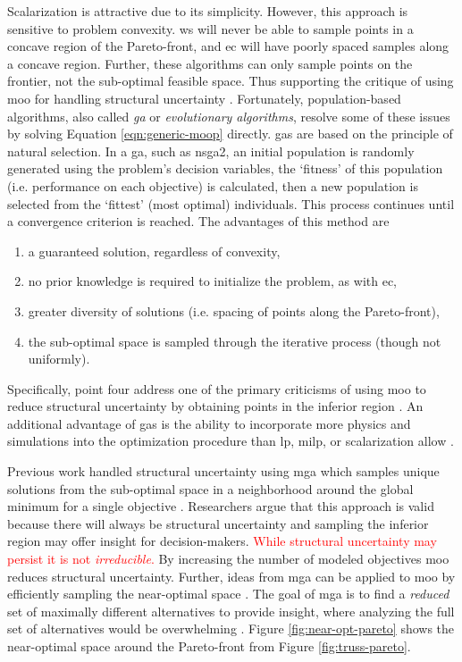 Scalarization is attractive due to its simplicity. However, this approach is
sensitive to problem convexity. \ac{ws} will never be able to sample points in a
concave region of the Pareto-front, and \ac{ec} will have poorly spaced samples
along a concave region. Further, these algorithms can only sample points on the
frontier, not the sub-optimal feasible space. Thus supporting the critique of
using \ac{moo} for handling structural uncertainty \cite{decarolis_using_2011}.
Fortunately, population-based algorithms, also called \textit{\ac{ga}} or
\textit{evolutionary algorithms}, resolve some of these issues by solving
Equation \ref{eqn:generic-moop} directly. \Acp{ga} are based on the principle of
natural selection. In a \ac{ga}, such as \ac{nsga2}, an initial population is
randomly generated using the problem's decision variables, the `fitness' of this
population (i.e. performance on each objective) is calculated, then a new
population is selected from the `fittest' (most optimal) individuals. This
process continues until a convergence criterion is reached. The advantages of
this method are
\begin{enumerate}
    \item a guaranteed solution, regardless of convexity,
    \item no prior knowledge is required to initialize the problem, as with
    \ac{ec},
    \item greater diversity of solutions (i.e. spacing of points along the
    Pareto-front),
    \item the sub-optimal space is sampled through the iterative process (though
    not uniformly).
\end{enumerate}
Specifically, point four address one of the primary criticisms of using \ac{moo}
to reduce structural uncertainty by obtaining points in the inferior region
\cite{loughlin_genetic_2001,zechman_evolutionary_2004,
zechman_evolutionary_2013}. An additional advantage of \acp{ga} is the ability
to incorporate more physics and simulations into the optimization procedure than
\ac{lp}, \ac{milp}, or scalarization allow \cite{loughlin_genetic_2001}. 

Previous work handled structural uncertainty using \ac{mga} which samples unique
solutions from the sub-optimal space in a neighborhood around the global minimum
for a single objective \cite{decarolis_using_2011}. Researchers argue that this
approach is valid because there will always be structural uncertainty and
sampling the inferior region may offer insight for decision-makers.
\textcolor{red}{While structural uncertainty may persist it is not
\textit{irreducible}.} By increasing the number of modeled objectives \ac{moo}
reduces structural uncertainty. Further, ideas from \ac{mga} can be applied to
\ac{moo} by efficiently sampling the near-optimal space
\cite{loughlin_genetic_2001,
zechman_evolutionary_2004,zechman_evolutionary_2013,pajares_comparison_2021}.
The goal of \ac{mga} is to find a \textit{reduced} set of maximally different
alternatives to provide insight, where analyzing the full set of alternatives
would be overwhelming \cite{decarolis_using_2011, pajares_comparison_2021}.
Figure \ref{fig:near-opt-pareto} shows the near-optimal space around the
Pareto-front from Figure \ref{fig:truss-pareto}.

